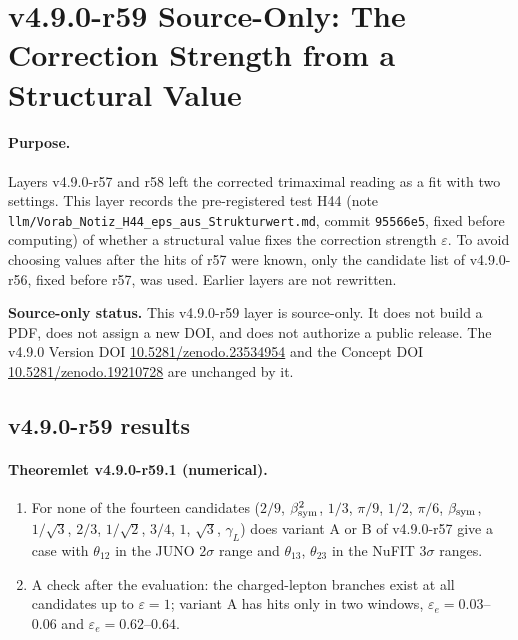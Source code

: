 \clearpage
\section*{v4.9.0-r59 Source-Only: The Correction Strength from a Structural Value}
\label{sec:v490-r59-eps-structural}

\paragraph{Purpose.}
Layers v4.9.0-r57 and r58 left the corrected trimaximal reading as a fit with two settings.  This layer records the pre-registered test H44 (note
\texttt{llm/Vorab\_Notiz\_H44\_eps\_aus\_Strukturwert.md}, commit \texttt{95566e5}, fixed before computing) of whether a structural value fixes the correction strength
\(\varepsilon\).  To avoid choosing values after the hits of r57 were known, only the candidate list of v4.9.0-r56, fixed before r57, was used.  Earlier layers are
not rewritten.

\noindent\textbf{Source-only status.}
This v4.9.0-r59 layer is source-only.  It does not build a PDF, does not assign a new DOI,
and does not authorize a public release.  The v4.9.0 Version DOI
\href{https://doi.org/10.5281/zenodo.23534954}{10.5281/zenodo.23534954} and the Concept DOI
\href{https://doi.org/10.5281/zenodo.19210728}{10.5281/zenodo.19210728} are unchanged by it.

\subsection*{v4.9.0-r59 results}
\label{subsec:v490-r59-results}

\paragraph{Theoremlet v4.9.0-r59.1 (numerical).}
\begin{enumerate}[leftmargin=2em]
\item[(a)] For none of the fourteen candidates (\(2/9\), \(\beta_{\rm sym}^2\), \(1/3\), \(\pi/9\), \(1/2\), \(\pi/6\), \(\beta_{\rm sym}\), \(1/\sqrt3\), \(2/3\), \(1/\sqrt2\), \(3/4\), \(1\),
\(\sqrt3\), \(\gamma_L\)) does variant A or B of v4.9.0-r57 give a case with \(\theta_{12}\) in the JUNO \(2\sigma\) range and \(\theta_{13}\), \(\theta_{23}\) in the NuFIT
\(3\sigma\) ranges.
\item[(b)] A check after the evaluation: the charged-lepton branches exist at all candidates up to \(\varepsilon=1\); variant A has hits only in two windows,
\(\varepsilon_e=0.03\)--\(0.06\) and \(\varepsilon_e=0.62\)--\(0.64\).
\end{enumerate}

